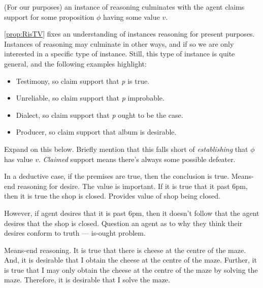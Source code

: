 \begin{note}
  \begin{proposition}\label{prop:RisTV}
    (For our purposes) an instance of reasoning culminates with the agent claims support for some proposition \(\phi\) having some value \(v\).
  \end{proposition}

  \autoref{prop:RisTV} fixes an understanding of instances reasoning for present purposes.
  Instances of reasoning may culminate in other ways, and if so we are only interested in a specific type of instance.
  Still, this type of instance is quite general, and the following examples highlight:

  \begin{itemize}
  \item Testimony, so claim support that \emph{p} is true.
  \item Unreliable, so claim support that \emph{p} improbable.
  \item Dialect, so claim support that \emph{p} ought to be the case.
  \item Producer, so claim support that album is desirable.
  \end{itemize}
\end{note}

\begin{note}
  Expand on this below.
  Briefly mention that this falls short of \emph{establishing} that \(\phi\) has value \(v\).
  \emph{Claimed} support means there's always some possible defeater.
\end{note}

\begin{note}
  In a deductive case, if the premises are true, then the conclusion is true.
  Means-end reasoning for desire.
  The value is important.
  If it is true that it past 6pm, then it is true the shop is closed.
  Provides value of shop being closed.

  However, if agent desires that it is past 6pm, then it doesn't follow that the agent desires that the shop is closed.
  Question an agent as to why they think their desires conform to truth --- is-ought problem.

  Means-end reasoning.
  It is true that there is cheese at the centre of the maze.
  And, it is desirable that I obtain the cheese at the centre of the maze.
  Further, it is true that I may only obtain the cheese at the centre of the maze by solving the maze.
  Therefore, it is desirable that I solve the maze.
\end{note}

